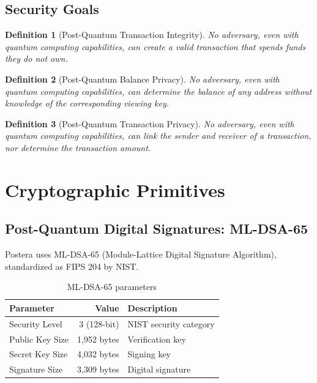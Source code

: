 \documentclass[11pt,a4paper]{article}
\newtheorem{definition}{Definition}
\begin{document}
\subsection{Security Goals}

\begin{definition}[Post-Quantum Transaction Integrity]
No adversary, even with quantum computing capabilities, can create a valid transaction that spends funds they do not own.
\end{definition}

\begin{definition}[Post-Quantum Balance Privacy]
No adversary, even with quantum computing capabilities, can determine the balance of any address without knowledge of the corresponding viewing key.
\end{definition}

\begin{definition}[Post-Quantum Transaction Privacy]
No adversary, even with quantum computing capabilities, can link the sender and receiver of a transaction, nor determine the transaction amount.
\end{definition}

\section{Cryptographic Primitives}

\subsection{Post-Quantum Digital Signatures: ML-DSA-65}

Postera uses ML-DSA-65 (Module-Lattice Digital Signature Algorithm), standardized as FIPS 204 by NIST.

\begin{table}[h]
\centering
\begin{tabular}{lrl}
\toprule
Parameter & Value & Description \\
\midrule
Security Level & 3 (128-bit) & NIST security category \\
Public Key Size & 1,952 bytes & Verification key \\
Secret Key Size & 4,032 bytes & Signing key \\
Signature Size & 3,309 bytes & Digital signature \\
\bottomrule
\end{tabular}
\caption{ML-DSA-65 parameters}
\end{table}
\end{document}
